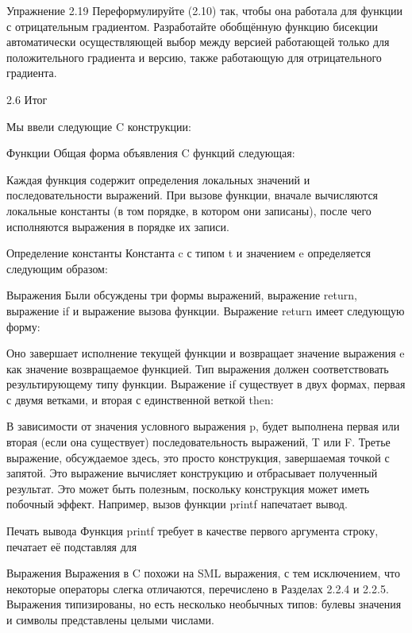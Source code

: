 Упражнение 2.19 Переформулируйте (2.10) так, чтобы она работала для функции с отрицательным градиентом. Разработайте обобщённую функцию бисекции автоматически осуществляющей выбор между версией работающей только для положительного градиента и версию, также работающую для отрицательного градиента.

2.6 Итог

Мы ввели следующие C конструкции:

Функции Общая форма объявления C функций следующая:

Каждая функция содержит определения локальных значений и последовательности выражений. При вызове функции, вначале вычисляются локальные константы (в том порядке, в котором они записаны), после чего исполняются выражения в порядке их записи.

Определение константы Константа c с типом t и значением e определяется следующим образом:

Выражения Были обсуждены три формы выражений, выражение return, выражение if и выражение вызова функции. Выражение return имеет следующую форму:

Оно завершает исполнение текущей функции и возвращает значение выражения e как значение возвращаемое функцией. Тип выражения должен соответствовать результирующему типу функции. Выражение if существует в двух формах, первая с двумя ветками, и вторая с единственной веткой then:

В зависимости от значения условного выражения p, будет выполнена первая или вторая (если она существует) последовательность выражений, T или F. Третье выражение, обсуждаемое здесь, это просто конструкция, завершаемая точкой с запятой. Это выражение вычисляет конструкцию и отбрасывает полученный результат. Это может быть полезным, поскольку конструкция может иметь побочный эффект. Например, вызов функции printf напечатает вывод.

Печать вывода Функция printf требует в качестве первого аргумента строку, печатает её подставляя для %


Выражения Выражения в C похожи на SML выражения, с тем исключением, что некоторые операторы слегка отличаются, перечислено в Разделах 2.2.4 и 2.2.5. Выражения типизированы, но есть несколько необычных типов: булевы значения и символы представлены целыми числами.

